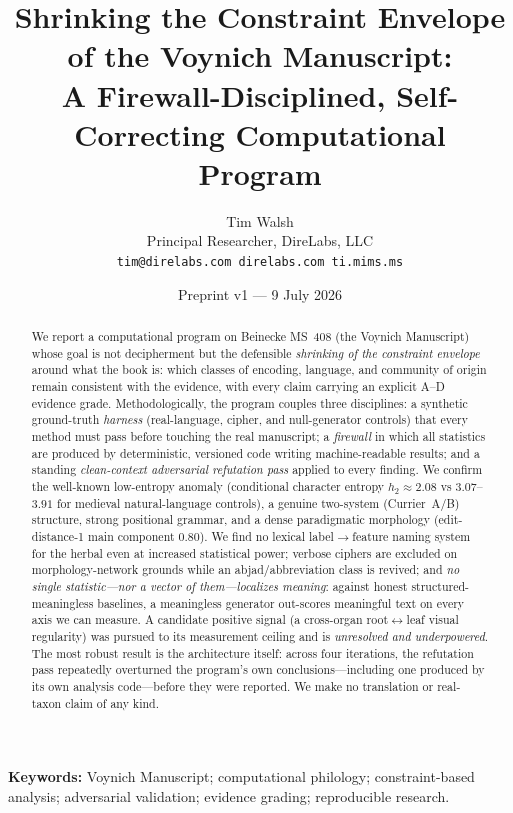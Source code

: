 \documentclass[11pt]{article}
\title{\textbf{Shrinking the Constraint Envelope of the Voynich Manuscript:\\
A Firewall-Disciplined, Self-Correcting Computational Program}}
\author{Tim Walsh \\ \small Principal Researcher, DireLabs, LLC \\
\small \texttt{tim@direlabs.com \quad direlabs.com \quad ti.mims.ms}}
\date{Preprint v1 --- 9 July 2026}
\begin{document}
\maketitle

\begin{abstract}
\noindent We report a computational program on Beinecke MS~408 (the Voynich
Manuscript) whose goal is not decipherment but the defensible \emph{shrinking of the
constraint envelope} around what the book is: which classes of encoding, language,
and community of origin remain consistent with the evidence, with every claim carrying
an explicit A--D evidence grade. Methodologically, the program couples three
disciplines: a synthetic ground-truth \emph{harness} (real-language, cipher, and
null-generator controls) that every method must pass before touching the real
manuscript; a \emph{firewall} in which all statistics are produced by deterministic,
versioned code writing machine-readable results; and a standing \emph{clean-context
adversarial refutation pass} applied to every finding. We confirm the well-known
low-entropy anomaly (conditional character entropy $h_2\approx 2.08$ vs
$3.07$--$3.91$ for medieval natural-language controls), a genuine two-system
(Currier~A/B) structure, strong positional grammar, and a dense paradigmatic
morphology (edit-distance-1 main component $0.80$). We find no lexical
label$\rightarrow$feature naming system for the herbal even at increased statistical
power; verbose ciphers are excluded on morphology-network grounds while an
abjad/abbreviation class is revived; and \emph{no single statistic---nor a vector of
them---localizes meaning}: against honest structured-meaningless baselines, a
meaningless generator out-scores meaningful text on every axis we can measure. A
candidate positive signal (a cross-organ root$\leftrightarrow$leaf visual regularity)
was pursued to its measurement ceiling and is \emph{unresolved and underpowered}. The
most robust result is the architecture itself: across four iterations, the refutation
pass repeatedly overturned the program's own conclusions---including one produced by
its own analysis code---before they were reported. We make no translation or
real-taxon claim of any kind.
\end{abstract}

\noindent\textbf{Keywords:} Voynich Manuscript; computational philology;
constraint-based analysis; adversarial validation; evidence grading; reproducible
research.
\end{document}
